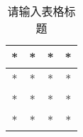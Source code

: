 
\begin{table}[ht]
\centering
\caption{请输入表格标题}\label{DE_tab1}
\begin{tabular}{|c|c|c|c|}
\hline
* & * & * & * \\
\hline
* & * & * & * \\
\hline
* & * & * & * \\
\hline
* & * & * & * \\
\hline
\end{tabular}
\end{table}